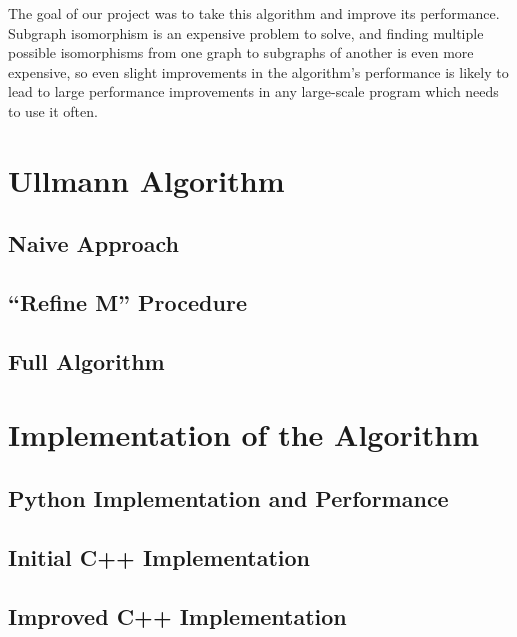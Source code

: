 \documentclass{article}
\begin{document}
The goal of our project was to take this algorithm and improve its performance. Subgraph isomorphism is an expensive problem to solve, and finding multiple possible isomorphisms from one graph to subgraphs of another is even more expensive, so even slight improvements in the algorithm's performance is likely to lead to large performance improvements in any large-scale program which needs to use it often.

\section{Ullmann Algorithm}

  \subsection{Naive Approach}

  \subsection{``Refine M'' Procedure}

  \subsection{Full Algorithm}

\section{Implementation of the Algorithm}
  \subsection{Python Implementation and Performance}

  \subsection{Initial C++ Implementation}

  \subsection{Improved C++ Implementation}
\end{document}
